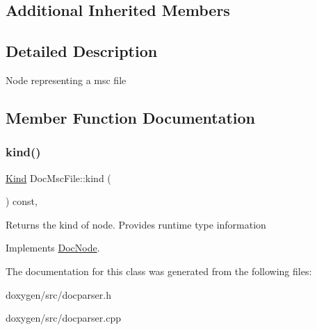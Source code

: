 \subsection*{Additional Inherited Members}


\subsection{Detailed Description}
Node representing a msc file 

\subsection{Member Function Documentation}
\mbox{\label{class_doc_msc_file_a99e65660ad498deb47ef3b5e9f456df1}} 
\subsubsection{\texorpdfstring{kind()}{kind()}}
{\footnotesize\ttfamily \mbox{\hyperlink{class_doc_node_aebd16e89ca590d84cbd40543ea5faadb}{Kind}} Doc\+Msc\+File\+::kind (\begin{DoxyParamCaption}{ }\end{DoxyParamCaption}) const\hspace{0.3cm}{\ttfamily [inline]}, {\ttfamily [virtual]}}

Returns the kind of node. Provides runtime type information 

Implements \mbox{\hyperlink{class_doc_node_a108ffd214a72ba6e93dac084a8f58049}{Doc\+Node}}.



The documentation for this class was generated from the following files\+:\begin{DoxyCompactItemize}
\item 
doxygen/src/docparser.\+h\item 
doxygen/src/docparser.\+cpp\end{DoxyCompactItemize}
